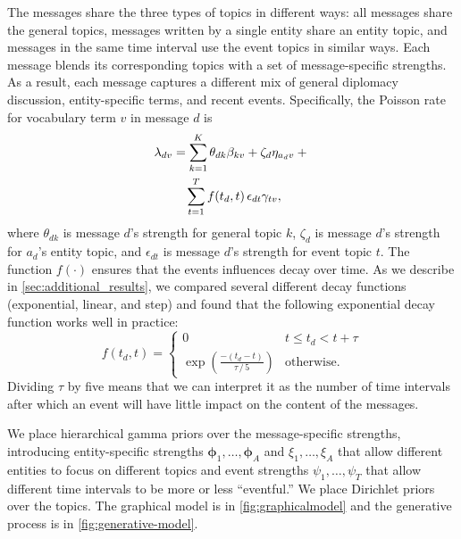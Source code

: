 The messages share the three types of topics in different ways: all
messages share the general topics, messages written by a single entity
share an entity topic, and messages in the same time interval use the
event topics in similar ways. Each message blends its corresponding
topics with a set of message-specific strengths. As a result, each
message captures a different mix of general diplomacy discussion,
entity-specific terms, and recent events. Specifically, the Poisson
rate for vocabulary term $v$ in message $d$ is
\begin{align}
  \lambda_{dv} &= \sum_{k=1}^K \theta_{dk} \beta_{kv}  + \zeta_d
  \eta_{a_dv} + {}\notag \\
  &\quad
  \sum_{t=1}^T f(t_d, t)\, \epsilon_{dt} \gamma_{tv},
\label{eq:poisrate}
\end{align}
where $\theta_{dk}$ is message $d$'s strength for general topic $k$,
$\zeta_{d}$ is message $d$'s strength for $a_d$'s entity topic, and
$\epsilon_{dt}$ is message $d$'s strength for event topic $t$. The
function $f(\cdot)$ ensures that the events influences decay over
time. As we describe in \cref{sec:additional_results}, we compared
several different decay functions (exponential, linear, and step) and
found that the following exponential decay function works well in
practice:
\begin{equation}
  f(t_d, t) = \begin{cases}
    0 & \textrm{$t \le t_d < t + \tau$}\\
    \exp{\left( \frac{-(t_d - t)}{\tau\,/\,5}\right)} &
    \textrm{otherwise.}
    \end{cases}
  \label{eq:f}
  \end{equation}
Dividing $\tau$ by five means that we can interpret it as the number
of time intervals after which an event will have little impact on the
content of the messages.

We place hierarchical gamma priors over the message-specific
strengths, introducing entity-specific strengths $\mathbold{\phi}_1,
\ldots, \mathbold{\phi}_A$ and $\xi_1, \ldots, \xi_A$ that allow
different entities to focus on different topics and event strengths
$\psi_1, \ldots, \psi_T$ that allow different time intervals to be
more or less ``eventful.'' We place Dirichlet priors over the
topics. The graphical model is in \cref{fig:graphicalmodel} and the
generative process is in \cref{fig:generative-model}.

